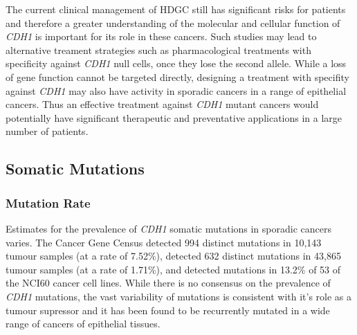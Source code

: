 The current clinical management of \gls{HDGC} still has significant risks for patients and therefore a greater understanding of the molecular and cellular function of \textit{CDH1} is important for its role in these cancers. Such studies may lead to alternative treament strategies such as pharmacological treatments with specificity against \textit{CDH1} null cells, once they lose the second allele. While a loss of gene function cannot be targeted directly, designing a treatment with specifity against \textit{CDH1} may also have activity in sporadic cancers in a range of epithelial cancers. Thus an effective treatment against \textit{CDH1} mutant cancers would potentially have significant therapeutic and preventative applications in a large number of patients.

\subsection{Somatic Mutations}
\subsubsection{Mutation Rate}

Estimates for the prevalence of \textit{CDH1} somatic mutations  in sporadic cancers varies. The Cancer Gene Census \citep{Futreal2004, Pleasance2010} detected 994 distinct mutations in 10,143 tumour samples (at a rate of 7.52\%), \citet{COSMICdb} detected 632 distinct mutations in 43,865 tumour samples (at a rate of 1.71\%), and detected mutations in 13.2\% of 53 of the NCI60 cancer cell lines. While there is no consensus on the prevalence of \textit{CDH1} mutations, the vast variability of mutations is consistent with it's role as a tumour supressor and it has been found to be recurrently mutated in a wide range of cancers of epithelial tissues.

